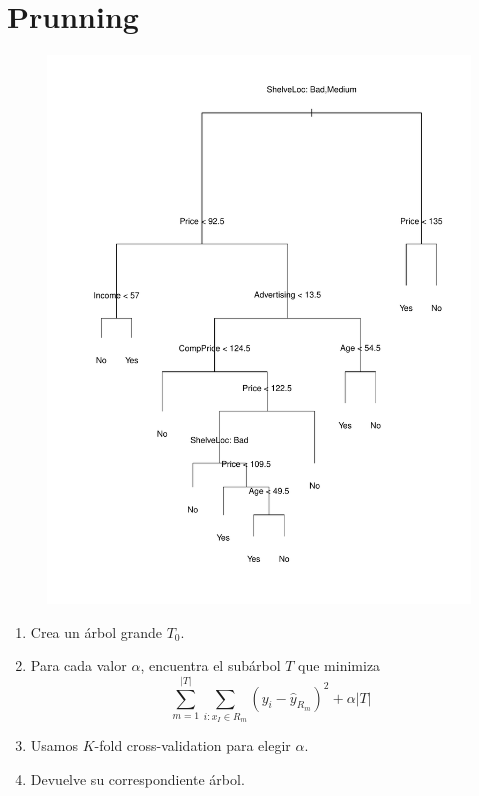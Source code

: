 \documentclass{beamer}
\theoremstyle{definition}
\begin{document}
\section{Prunning}
\begin{frame}
\begin{figure}[h!]
\includegraphics[scale=0.28]{arbolgrande}
\end{figure}
\end{frame}

\begin{frame}
\begin{enumerate}
	\item<1-> Crea un árbol grande $T_0$.
	\item<2-> Para cada valor $\alpha$, encuentra el subárbol $T$ que minimiza
	\[ \sum_{m=1}^{|T|} \sum_{i\colon x_I \in R_m} (y_i - \widehat{y}_{R_m})^2 + \alpha|T| \]
	\item<3-> Usamos $K$-fold cross-validation para elegir $\alpha$.
	\item<4-> Devuelve su correspondiente árbol.
\end{enumerate}
\end{frame}
\end{document}
